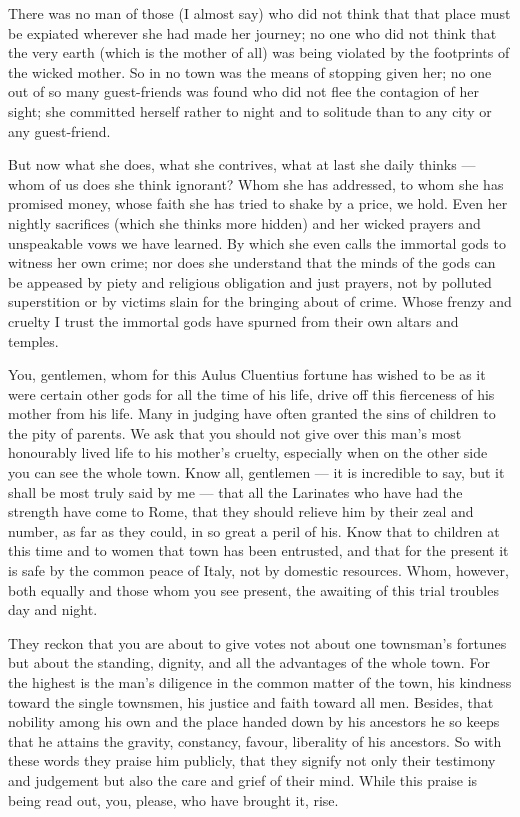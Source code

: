  There was no man of those (I almost say) who did not think that that place must be expiated wherever she had made her journey; no one who did not think that the very earth (which is the mother of all) was being violated by the footprints of the wicked mother. So in no town was the means of stopping given her; no one out of so many guest-friends was found who did not flee the contagion of her sight; she committed herself rather to night and to solitude than to any city or any guest-friend.

 But now what she does, what she contrives, what at last she daily thinks --- whom of us does she think ignorant? Whom she has addressed, to whom she has promised money, whose faith she has tried to shake by a price, we hold. Even her nightly sacrifices (which she thinks more hidden) and her wicked prayers and unspeakable vows we have learned. By which she even calls the immortal gods to witness her own crime; nor does she understand that the minds of the gods can be appeased by piety and religious obligation and just prayers, not by polluted superstition or by victims slain for the bringing about of crime. Whose frenzy and cruelty I trust the immortal gods have spurned from their own altars and temples.

 You, gentlemen, whom for this Aulus Cluentius fortune has wished to be as it were certain other gods for all the time of his life, drive off this fierceness of his mother from his life. Many in judging have often granted the sins of children to the pity of parents. We ask that you should not give over this man's most honourably lived life to his mother's cruelty, especially when on the other side you can see the whole town. Know all, gentlemen --- it is incredible to say, but it shall be most truly said by me --- that all the Larinates who have had the strength have come to Rome, that they should relieve him by their zeal and number, as far as they could, in so great a peril of his. Know that to children at this time and to women that town has been entrusted, and that for the present it is safe by the common peace of Italy, not by domestic resources. Whom, however, both equally and those whom you see present, the awaiting of this trial troubles day and night.

 They reckon that you are about to give votes not about one townsman's fortunes but about the standing, dignity, and all the advantages of the whole town. For the highest is the man's diligence in the common matter of the town, his kindness toward the single townsmen, his justice and faith toward all men. Besides, that nobility among his own and the place handed down by his ancestors he so keeps that he attains the gravity, constancy, favour, liberality of his ancestors. So with these words they praise him publicly, that they signify not only their testimony and judgement but also the care and grief of their mind. While this praise is being read out, you, please, who have brought it, rise.

